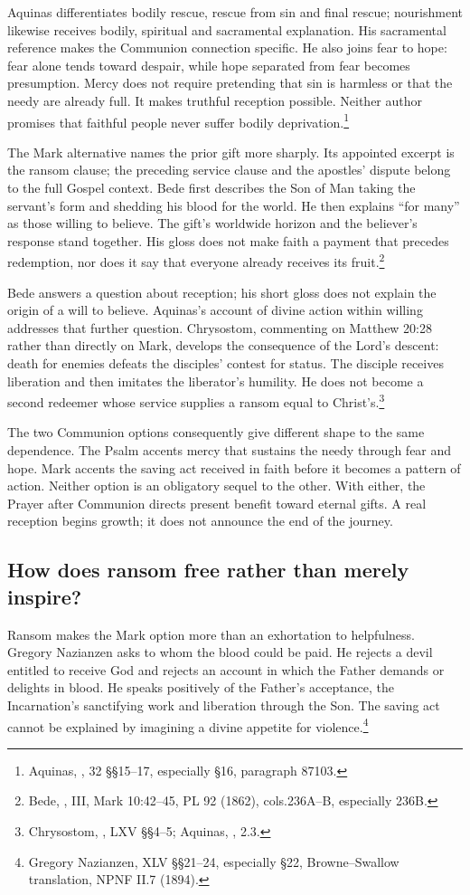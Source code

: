 Aquinas differentiates bodily rescue, rescue from sin and final rescue; nourishment likewise receives bodily, spiritual and sacramental explanation. His sacramental reference makes the Communion connection specific. He also joins fear to hope: fear alone tends toward despair, while hope separated from fear becomes presumption. Mercy does not require pretending that sin is harmless or that the needy are already full. It makes truthful reception possible. Neither author promises that faithful people never suffer bodily deprivation.\footnote{Aquinas, , 32 §§15--17, especially §16, paragraph 87103.}

The Mark alternative names the prior gift more sharply. Its appointed excerpt is the ransom clause; the preceding service clause and the apostles' dispute belong to the full Gospel context. Bede first describes the Son of Man taking the servant's form and shedding his blood for the world. He then explains ``for many'' as those willing to believe. The gift's worldwide horizon and the believer's response stand together. His gloss does not make faith a payment that precedes redemption, nor does it say that everyone already receives its fruit.\footnote{Bede, , III, Mark 10:42--45, PL 92 (1862), cols.236A--B, especially 236B.}

Bede answers a question about reception; his short gloss does not explain the origin of a will to believe. Aquinas's account of divine action within willing addresses that further question. Chrysostom, commenting on Matthew 20:28 rather than directly on Mark, develops the consequence of the Lord's descent: death for enemies defeats the disciples' contest for status. The disciple receives liberation and then imitates the liberator's humility. He does not become a second redeemer whose service supplies a ransom equal to Christ's.\footnote{Chrysostom, , LXV §§4--5; Aquinas, , 2.3.}

The two Communion options consequently give different shape to the same dependence. The Psalm accents mercy that sustains the needy through fear and hope. Mark accents the saving act received in faith before it becomes a pattern of action. Neither option is an obligatory sequel to the other. With either, the Prayer after Communion directs present benefit toward eternal gifts. A real reception begins growth; it does not announce the end of the journey.

\subsection{How does ransom free rather than merely inspire?}
Ransom makes the Mark option more than an exhortation to helpfulness. Gregory Nazianzen asks to whom the blood could be paid. He rejects a devil entitled to receive God and rejects an account in which the Father demands or delights in blood. He speaks positively of the Father's acceptance, the Incarnation's sanctifying work and liberation through the Son. The saving act cannot be explained by imagining a divine appetite for violence.\footnote{Gregory Nazianzen,  XLV §§21--24, especially §22, Browne--Swallow translation, NPNF II.7 (1894).}

